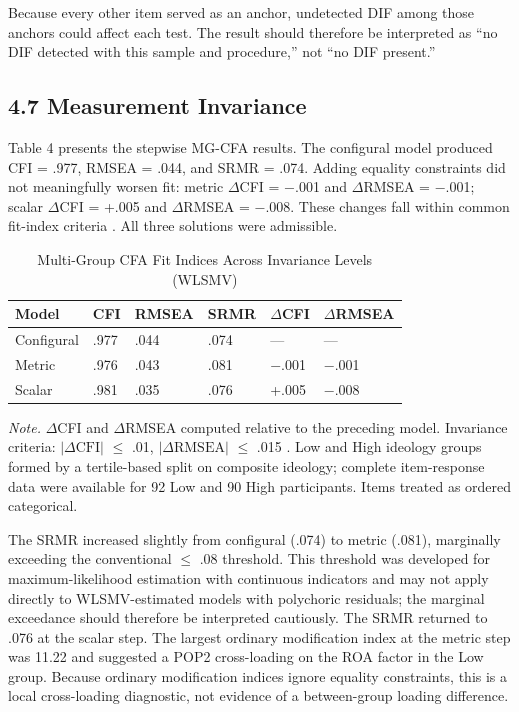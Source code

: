 \documentclass[PCJ,Unicode,screen,mode=plain]{cedram}
\begin{document}
Because every other item served as an anchor, undetected DIF among
those anchors could affect each test. The result should therefore be
interpreted as ``no DIF detected with this sample and procedure,'' not
``no DIF present.''

\subsection*{4.7 Measurement Invariance}\label{measurement-invariance}

Table 4 presents the stepwise MG-CFA results. The configural model produced CFI = .977, RMSEA = .044, and SRMR = .074. Adding equality constraints did not meaningfully worsen fit: metric \(\Delta\)CFI = $-$.001 and \(\Delta\)RMSEA = $-$.001; scalar \(\Delta\)CFI = +.005 and \(\Delta\)RMSEA = $-$.008. These changes fall within common fit-index criteria \citep{Chen2007,Cheung2002}. All three solutions were admissible.

\begin{longtable}[]{@{}llllll@{}}
\caption{Multi-Group CFA Fit Indices Across Invariance Levels (WLSMV)}\label{tab:4}\\
\toprule
Model & CFI & RMSEA & SRMR & \(\Delta\)CFI & \(\Delta\)RMSEA \\
\midrule
\endhead
\bottomrule
\endlastfoot
Configural & .977 & .044 & .074 & --- & --- \\
Metric & .976 & .043 & .081 & $-$.001 & $-$.001 \\
Scalar & .981 & .035 & .076 & +.005 & $-$.008 \\
\end{longtable}

\emph{Note.} \(\Delta\)CFI and \(\Delta\)RMSEA computed relative to the preceding model. Invariance criteria: $|\Delta\text{CFI}|$ \(\leq\) .01, $|\Delta\text{RMSEA}|$ \(\leq\) .015 \citep{Chen2007}. Low and High ideology groups formed by a tertile-based split on composite ideology; complete item-response data were available for 92 Low and 90 High participants. Items treated as ordered categorical.

The SRMR increased slightly from configural (.074) to metric (.081),
marginally exceeding the conventional \(\leq\) .08 threshold. This
threshold was developed for maximum-likelihood estimation with
continuous indicators and may not apply directly to WLSMV-estimated
models with polychoric residuals; the marginal exceedance should
therefore be interpreted cautiously. The SRMR returned to .076 at the
scalar step. The largest ordinary modification index at the metric step
was 11.22 and suggested a POP2 cross-loading on the ROA factor in the
Low group. Because ordinary modification indices ignore equality
constraints, this is a local cross-loading diagnostic, not evidence of
a between-group loading difference.
\end{document}
